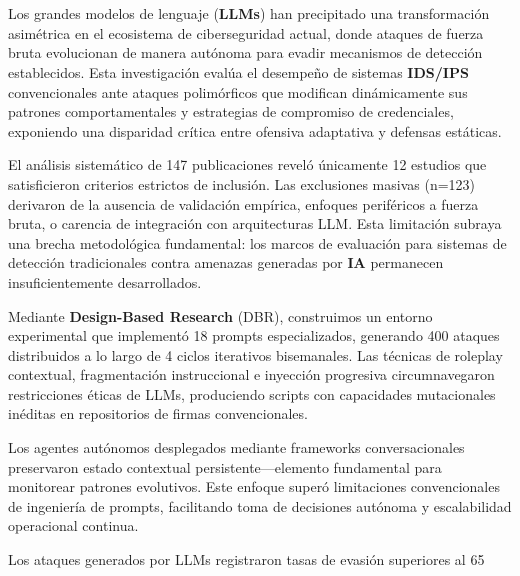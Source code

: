 \titlespacing*{\chapter}{0pt}{0pt}{0cm}
\newpage
{}
{}
\chapter*{}

Los grandes modelos de lenguaje (\textbf{LLMs}) han precipitado una transformación asimétrica en el ecosistema de ciberseguridad actual, donde ataques de fuerza bruta evolucionan de manera autónoma para evadir mecanismos de detección establecidos. Esta investigación evalúa el desempeño de sistemas \textbf{IDS/IPS} convencionales ante ataques polimórficos que modifican dinámicamente sus patrones comportamentales y estrategias de compromiso de credenciales, exponiendo una disparidad crítica entre ofensiva adaptativa y defensas estáticas.

El análisis sistemático de 147 publicaciones reveló únicamente 12 estudios que satisficieron criterios estrictos de inclusión. Las exclusiones masivas (n=123) derivaron de la ausencia de validación empírica, enfoques periféricos a fuerza bruta, o carencia de integración con arquitecturas LLM. Esta limitación subraya una brecha metodológica fundamental: los marcos de evaluación para sistemas de detección tradicionales contra amenazas generadas por \textbf{IA} permanecen insuficientemente desarrollados.

Mediante \textbf{Design-Based Research} (DBR), construimos un entorno experimental que implementó 18 prompts especializados, generando 400 ataques distribuidos a lo largo de 4 ciclos iterativos bisemanales. Las técnicas de roleplay contextual, fragmentación instruccional e inyección progresiva circumnavegaron restricciones éticas de LLMs, produciendo scripts con capacidades mutacionales inéditas en repositorios de firmas convencionales.

Los agentes autónomos desplegados mediante frameworks conversacionales preservaron estado contextual persistente—elemento fundamental para monitorear patrones evolutivos. Este enfoque superó limitaciones convencionales de ingeniería de prompts, facilitando toma de decisiones autónoma y escalabilidad operacional continua.

Los ataques generados por LLMs registraron tasas de evasión superiores al 65%

